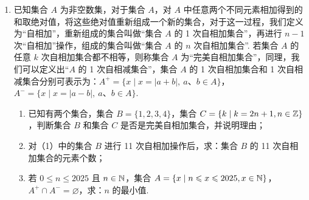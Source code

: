 \documentclass[a4paper,11pt]{article}
\begin{document}
\begin{enumerate}
\begin{enumerate}[label=(\arabic*)]
\item 若 $A=\{0,1,2\}$，写出 $A^+$；
\item %
      写出一个 $A$，使得 $A=A^+$；
\item 当 $n=4$ 时，是否存在集合 $A$，使得 $A^+=\{2,3,5,6,7,8,10\}$？若存在，求出此时的集合 $A$，若不存在，请说明理由.
\end{enumerate}


\ifanswer
\solbegin
{}
\solend

\fi

\ansspace[8]

\ansneed{7cm}

\item 已知集合 $A$ 为非空数集，对于集合 $A$，对 $A$ 中任意两个不同元素相加得到的和取绝对值，将这些绝对值重新组成一个新的集合，对于这一过程，我们定义为“自相加”，重新组成的集合叫做“集合 $A$ 的 1 次自相加集合”，再进行 $n-1$ 次“自相加”操作，组成的集合叫做“集合 $A$ 的 $n$ 次自相加集合”. 若集合 $A$ 的任意 $k$ 次自相加集合都不相等，则称集合 $A$ 为“完美自相加集合”，同理，我们可以定义出“$A$ 的 1 次自相减集合”，集合 $A$ 的 1 次自相加集合和 1 次自相减集合分别可表示为：$A^+=\{x\mid x=|a+b|,\ a\text{、}b\in A\}$，$A^-=\{x\mid x=|a-b|,\ a\text{、}b\in A\}$.

\begin{enumerate}[label=(\arabic*)]
\item 已知有两个集合，集合 $B=\{1,2,3,4\}$，集合 $C=\{k\mid k=2n+1,n\in\mathbb{Z}\}$，判断集合 $B$ 和集合 $C$ 是否是完美自相加集合，并说明理由；
\item 对（1）中的集合 $B$ 进行 11 次自相加操作后，求：集合 $B$ 的 11 次自相加集合的元素个数；
\item 若 $0\leqslant n\leqslant 2025$ 且 $n\in\mathbb{N}$，集合 $A=\{x\mid n\leqslant x\leqslant 2025,x\in\mathbb{N}\}$，$A^+\cap A^-=\varnothing$，求：$n$ 的最小值.
\end{enumerate}


\end{enumerate}
\end{document}
